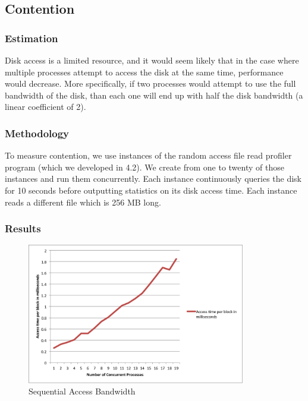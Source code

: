 \subsection{Contention}

\subsubsection{Estimation}

Disk access is a limited resource, and it would seem likely that in the case where multiple processes attempt to access the disk at the same time, performance would decrease. More specifically, if two processes would attempt to use the full bandwidth of the disk, than each one will end up with half the disk bandwidth (a linear coefficient of 2).

\subsubsection{Methodology}

To measure contention, we use instances of the random access file read profiler program (which we developed in 4.2). We create from one to twenty of those instances and run them concurrently. Each instance continuously queries the disk for 10 seconds before outputting statistics on its disk access time. Each instance reads a different file which is 256 MB long. 

\subsubsection{Results}

\begin{figure}
 \centering
  \includegraphics[width=0.85\textwidth]{image/contention.png}
  \caption{Sequential Access Bandwidth}
 \label{fig:contention}
\end{figure}

